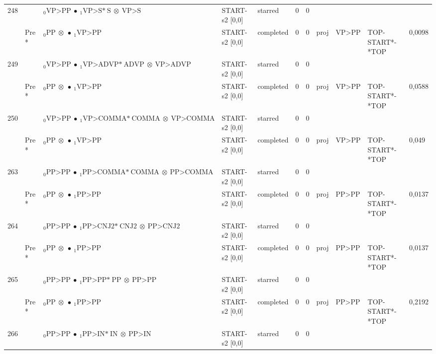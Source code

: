 \documentclass[10pt]{article}
\begin{document}
\begin{longtable}[htbp]{lllllllllll}
248 & & $ {}_0 \textrm{VP>PP} \  \bullet \ {}_{1} \textrm{VP>S*} \ \textrm{S} \  \otimes \ \textrm{VP>S} $ & START-s2 [0,0] & starred & 0 & 0 & & & & \\ 
 & Pre *& $ {}_0 \textrm{PP} \  \otimes \  \bullet \ {}_{1} \textrm{VP>PP} $ & START-s2 [0,0] & completed & 0 & 0 & proj & VP>PP & TOP-START*-*TOP & 0,0098 \\ 
249 & & $ {}_0 \textrm{VP>PP} \  \bullet \ {}_{1} \textrm{VP>ADVP*} \ \textrm{ADVP} \  \otimes \ \textrm{VP>ADVP} $ & START-s2 [0,0] & starred & 0 & 0 & & & & \\ 
 & Pre *& $ {}_0 \textrm{PP} \  \otimes \  \bullet \ {}_{1} \textrm{VP>PP} $ & START-s2 [0,0] & completed & 0 & 0 & proj & VP>PP & TOP-START*-*TOP & 0,0588 \\ 
250 & & $ {}_0 \textrm{VP>PP} \  \bullet \ {}_{1} \textrm{VP>COMMA*} \ \textrm{COMMA} \  \otimes \ \textrm{VP>COMMA} $ & START-s2 [0,0] & starred & 0 & 0 & & & & \\ 
 & Pre *& $ {}_0 \textrm{PP} \  \otimes \  \bullet \ {}_{1} \textrm{VP>PP} $ & START-s2 [0,0] & completed & 0 & 0 & proj & VP>PP & TOP-START*-*TOP & 0,049 \\ 
263 & & $ {}_0 \textrm{PP>PP} \  \bullet \ {}_{1} \textrm{PP>COMMA*} \ \textrm{COMMA} \  \otimes \ \textrm{PP>COMMA} $ & START-s2 [0,0] & starred & 0 & 0 & & & & \\ 
 & Pre *& $ {}_0 \textrm{PP} \  \otimes \  \bullet \ {}_{1} \textrm{PP>PP} $ & START-s2 [0,0] & completed & 0 & 0 & proj & PP>PP & TOP-START*-*TOP & 0,0137 \\ 
264 & & $ {}_0 \textrm{PP>PP} \  \bullet \ {}_{1} \textrm{PP>CNJ2*} \ \textrm{CNJ2} \  \otimes \ \textrm{PP>CNJ2} $ & START-s2 [0,0] & starred & 0 & 0 & & & & \\ 
 & Pre *& $ {}_0 \textrm{PP} \  \otimes \  \bullet \ {}_{1} \textrm{PP>PP} $ & START-s2 [0,0] & completed & 0 & 0 & proj & PP>PP & TOP-START*-*TOP & 0,0137 \\ 
265 & & $ {}_0 \textrm{PP>PP} \  \bullet \ {}_{1} \textrm{PP>PP*} \ \textrm{PP} \  \otimes \ \textrm{PP>PP} $ & START-s2 [0,0] & starred & 0 & 0 & & & & \\ 
 & Pre *& $ {}_0 \textrm{PP} \  \otimes \  \bullet \ {}_{1} \textrm{PP>PP} $ & START-s2 [0,0] & completed & 0 & 0 & proj & PP>PP & TOP-START*-*TOP & 0,2192 \\ 
266 & & $ {}_0 \textrm{PP>PP} \  \bullet \ {}_{1} \textrm{PP>IN*} \ \textrm{IN} \  \otimes \ \textrm{PP>IN} $ & START-s2 [0,0] & starred & 0 & 0 & & & & \\ 

\end{longtable}
\end{document}
